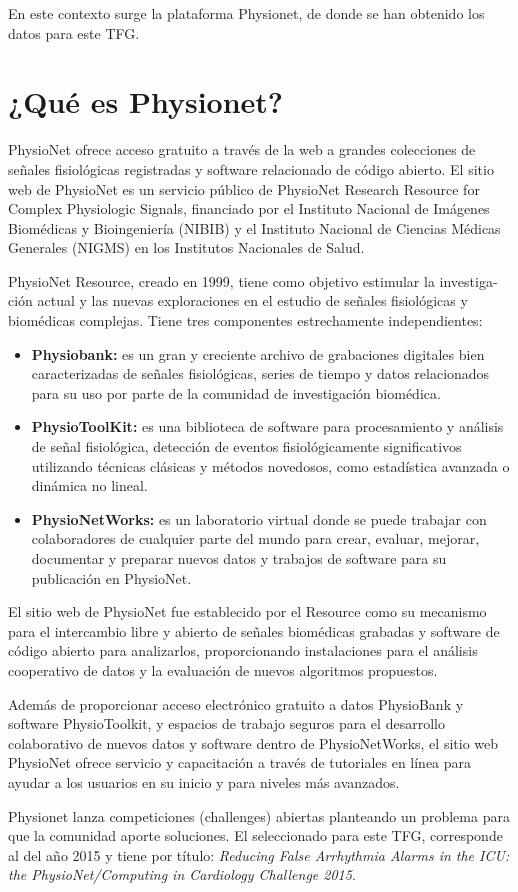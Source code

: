 	En este contexto surge la plataforma Physionet, de donde se han obtenido los datos para este TFG.
\section{¿Qué es Physionet?}

	PhysioNet ofrece acceso gratuito a través de la web a grandes colecciones de señales fisiológicas registradas y software relacionado de código abierto. El sitio web de PhysioNet es un servicio público de PhysioNet Research Resource for Complex Physiologic Signals, financiado por el Instituto Nacional de Imágenes Biomédicas y Bioingeniería (NIBIB) y el  Instituto Nacional de Ciencias Médicas Generales (NIGMS) en los Institutos Nacionales de Salud.\par 
	PhysioNet Resource, creado en 1999, tiene como objetivo estimular la investiga-
ción actual y las nuevas exploraciones en el estudio de señales fisiológicas y biomédicas complejas. Tiene tres componentes estrechamente independientes:

\begin{itemize}
\item \textbf{Physiobank:} es un gran y creciente archivo de grabaciones digitales bien caracterizadas de señales fisiológicas, series de tiempo y datos relacionados para su uso por parte de la comunidad de investigación biomédica.
\item \textbf{PhysioToolKit:} es una biblioteca de software para procesamiento y análisis de señal fisiológica, detección de eventos fisiológicamente significativos utilizando técnicas clásicas y métodos novedosos, como estadística avanzada o dinámica no lineal.
\item \textbf{PhysioNetWorks:} es un laboratorio virtual donde se puede trabajar con colaboradores de cualquier parte del mundo para crear, evaluar, mejorar, documentar y preparar nuevos datos y trabajos de software para su publicación en PhysioNet.
\end{itemize}

	El sitio web de PhysioNet fue establecido por el Resource como su mecanismo para el intercambio libre y abierto de señales biomédicas grabadas y software de código abierto para analizarlos, proporcionando instalaciones para el análisis cooperativo de datos y la evaluación de nuevos algoritmos propuestos.\par 
	
	Además de proporcionar acceso electrónico gratuito a datos PhysioBank y software PhysioToolkit, y espacios de trabajo seguros para el desarrollo colaborativo de nuevos datos y software dentro de PhysioNetWorks, el sitio web PhysioNet ofrece servicio y capacitación a través de tutoriales en línea para ayudar a los usuarios en su inicio y para niveles más avanzados.\par 
	
	Physionet lanza competiciones (challenges) abiertas planteando un problema para que la comunidad aporte soluciones. El seleccionado para este TFG, corresponde al del año 2015 y tiene por título: \textit{Reducing False Arrhythmia Alarms in the ICU: the PhysioNet/Computing in Cardiology Challenge 2015}.
